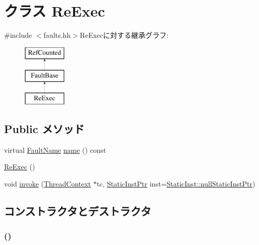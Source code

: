 \hypertarget{classReExec}{
\section{クラス ReExec}
\label{classReExec}
}


{\ttfamily \#include $<$faults.hh$>$}ReExecに対する継承グラフ:\begin{figure}[H]
\begin{center}
\leavevmode
\includegraphics[height=3cm]{classReExec}
\end{center}
\end{figure}
\subsection*{Public メソッド}
\begin{DoxyCompactItemize}
\item 
virtual \hyperlink{sim_2faults_8hh_abb196df64725e5c2568c900cf130d8d7}{FaultName} \hyperlink{classReExec_a127f8e4ea265460c26320765ce2a45c7}{name} () const 
\item 
\hyperlink{classReExec_a493976f206e617c1579710c1f021e47f}{ReExec} ()
\item 
void \hyperlink{classReExec_a2bd783b42262278d41157d428e1f8d6f}{invoke} (\hyperlink{classThreadContext}{ThreadContext} $\ast$tc, \hyperlink{classRefCountingPtr}{StaticInstPtr} inst=\hyperlink{classStaticInst_aa793d9793af735f09096369fb17567b6}{StaticInst::nullStaticInstPtr})
\end{DoxyCompactItemize}


\subsection{コンストラクタとデストラクタ}
\hypertarget{classReExec_a493976f206e617c1579710c1f021e47f}{
\subsubsection[{ReExec}]{ ()}}
\label{classReExec_a493976f206e617c1579710c1f021e47f}



